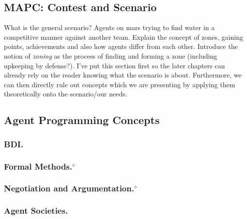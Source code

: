 \subsection{MAPC: Contest and Scenario}
What is the general scenario? Agents on mars trying to find water in a competitive manner against another team. Explain the concept of zones, gaining points, achievements and also how agents differ from each other. Introduce the notion of \emph{zoning} as the process of finding and forming a zone (including upkeeping by defense?).
I've put this section first so the later chapters can already rely on the reader knowing what the scenario is about. Furthermore, we can then directly rule out concepts which we are presenting by applying them theoretically onto the scenario/our needs.

\subsection{Agent Programming Concepts}
\subsubsection{BDI.}


\subsubsection[Formal Methods.]{Formal Methods.$^\diamond$}


\subsubsection[Negotiation and Argumentation.]{Negotiation and Argumentation.$^\diamond$}


\subsubsection{Agent Societies.}
